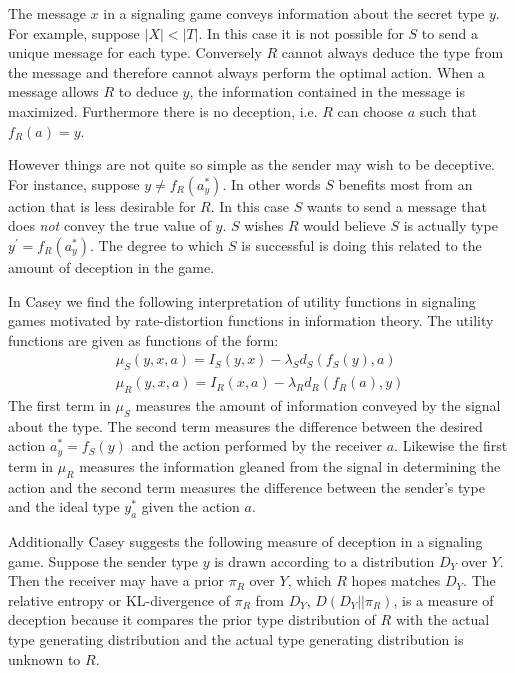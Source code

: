 \documentclass{article}
\begin{document}
The message $x$ in a signaling game conveys information about the secret type $y$. For example, suppose $\vert X \vert < \vert T \vert$. In this case it is not possible for $S$ to send a unique message for each type. Conversely $R$ cannot always deduce the type from the message and therefore cannot always perform the optimal action. When a message allows $R$ to deduce $y$, the information contained in the message is maximized. Furthermore there is no deception, i.e. $R$ can choose $a$ such that $f_R(a) = y$.

However things are not quite so simple as the sender may wish to be deceptive. For instance, suppose $y \ne f_R(a_y^*)$. In other words $S$ benefits most from an action that is less desirable for $R$. In this case $S$ wants to send a message that does \emph{not} convey the true value of $y$. $S$ wishes $R$ would believe $S$ is actually type $y^\prime = f_R(a_y^*)$. The degree to which $S$ is successful is doing this related to the amount of deception in the game.

In Casey\cite{casey1} we find the following interpretation of utility functions in signaling games motivated by rate-distortion functions in information theory.  The utility functions are given as functions of the form:
\begin{align*}
    \mu_S(y, x, a) = I_S(y, x) - \lambda_S d_S(f_S(y), a)\\
    \mu_R(y, x, a) = I_R(x, a) - \lambda_R d_R(f_R(a), y)
\end{align*}
\noindent The first term in $\mu_S$ measures the amount of information conveyed by the signal about the type. The second term measures the difference between the desired action $a_y^* = f_S(y)$ and the action performed by the receiver $a$. Likewise the first term in $\mu_R$ measures the information gleaned from the signal in determining the action and the second term measures the difference between the sender's type and the ideal type $y_a^*$ given the action $a$.

Additionally Casey suggests the following measure of deception in a signaling game. Suppose the sender type $y$ is drawn according to a distribution $D_Y$ over $Y$. Then the receiver may have a prior $\pi_R$ over $Y$, which $R$ hopes matches $D_Y$. The relative entropy or KL-divergence of $\pi_R$ from $D_Y$, $D(D_Y\vert\vert\pi_R)$, is a measure of deception because it compares the prior type distribution of $R$ with the actual type generating distribution and the actual type generating distribution is unknown to $R$. 
\end{document}
